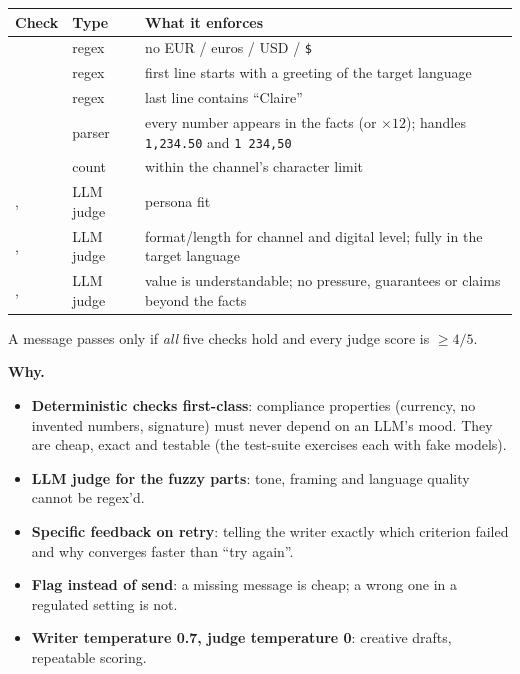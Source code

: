 \documentclass[11pt,a4paper]{article}
\newcommand{\code}[1]{\texttt{\detokenize{#1}}}
\newcommand{\why}[1]{\par\needspace{6\baselineskip}\smallskip\noindent\textbf{\textcolor{ca}{Why.}} #1\par}
\begin{document}
\begin{center}
\small
\begin{tabularx}{\linewidth}{@{}p{3.6cm}p{2cm}X@{}}
\toprule
\textbf{Check} & \textbf{Type} & \textbf{What it enforces}\\
\midrule
\code{currency} & regex & no EUR / euros / USD / \texttt{\$}\\
\code{greeting} & regex & first line starts with a greeting of the target language\\
\code{signature} & regex & last line contains ``Claire''\\
\code{numbers} & parser & every number appears in the facts (or $\times12$); handles \texttt{1,234.50} and \texttt{1\,234,50}\\
\code{length} & count & within the channel's character limit\\
\midrule
\code{tone_match}, \code{motivation_framing} & LLM judge & persona fit\\
\code{channel_fit}, \code{language_correct} & LLM judge & format/length for channel and digital level; fully in the target language\\
\code{clarity}, \code{no_overpromise} & LLM judge & value is understandable; no pressure, guarantees or claims beyond the facts\\
\bottomrule
\end{tabularx}
\end{center}
A message passes only if \emph{all} five checks hold and every judge score is $\geq 4/5$.

\why{
\begin{itemize}
\item \textbf{Deterministic checks first-class}: compliance properties (currency, no invented numbers, signature) must never depend on an LLM's mood. They are cheap, exact and testable (the test-suite exercises each with fake models).
\item \textbf{LLM judge for the fuzzy parts}: tone, framing and language quality cannot be regex'd.
\item \textbf{Specific feedback on retry}: telling the writer exactly which criterion failed and why converges faster than ``try again''.
\item \textbf{Flag instead of send}: a missing message is cheap; a wrong one in a regulated setting is not.
\item \textbf{Writer temperature 0.7, judge temperature 0}: creative drafts, repeatable scoring.
\end{itemize}}
\end{document}
